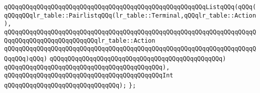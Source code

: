 \verb|qQQqqQQqqQQqqQQqqQQqqQQqqQQqqQQqqQQqqQQqqQQqqQQqqQQqqQQqListqQQq(qQQq(qQQqqQQqlr_table::PairlistqQQq(lr_table::Terminal,qQQqlr_table::Action),|\newline
\verb|qQQqqQQqqQQqqQQqqQQqqQQqqQQqqQQqqQQqqQQqqQQqqQQqqQQqqQQqqQQqqQQqqQQqqQQqqQQqqQQqqQQqqQQqqQQqqQQqlr_table::Action|\newline
\verb|qQQqqQQqqQQqqQQqqQQqqQQqqQQqqQQqqQQqqQQqqQQqqQQqqQQqqQQqqQQqqQQqqQQqqQQqqQQq)qQQq)|\newline
\verb|qQQqqQQqqQQqqQQqqQQqqQQqqQQqqQQqqQQqqQQqqQQqqQQq)|\newline
\verb|qQQqqQQqqQQqqQQqqQQqqQQqqQQqqQQqqQQqqQQqqQQq),|\newline
\verb|qQQqqQQqqQQqqQQqqQQqqQQqqQQqqQQqqQQqqQQqqQQqInt|\newline
\verb|qQQqqQQqqQQqqQQqqQQqqQQqqQQqqQQq);|\newline
\verb|};|\newline

